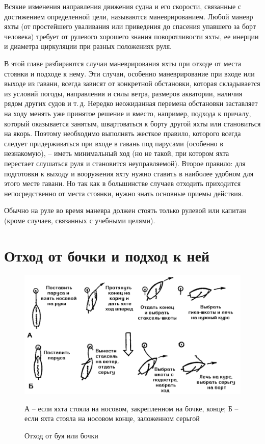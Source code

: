 \documentclass[a4paper, 12pt, twoside, final]{scrbook}
\begin{document}
Всякие изменения направления движения судна и его скорости, связанные с достижением определенной цели, называются маневрированием. Любой маневр яхты (от простейшего уваливания или приведения до спасения упавшего за борт человека) требует от рулевого хорошего знания поворотливости яхты, ее инерции и диаметра циркуляции при разных положениях руля.

В этой главе разбираются случаи маневрирования яхты при отходе от места стоянки и подходе к нему. Эти случаи, особенно маневрирование при входе или выходе из гавани, всегда зависят от конкретной обстановки, которая складывается из условий погоды, направления и силы ветра, размеров акватории, наличия рядом других судов и т.\,д. Нередко неожиданная перемена обстановки заставляет на ходу менять уже принятое решение и вместо, например, подхода к причалу, который оказывается занятым, швартоваться к борту другой яхты или становиться на якорь. Поэтому необходимо выполнять жесткое правило, которого всегда следует придерживаться при входе в гавань под парусами (особенно в незнакомую), \--- иметь минимальный ход (но не такой, при котором яхта перестает слушаться руля и становится неуправляемой). Второе правило: для подготовки к выходу и вооружения яхту нужно ставить в наиболее удобном для этого месте гавани. Но так как в большинстве случаев отходить приходится непосредственно от места стоянки, нужно знать основные приемы действия.

Обычно на руле во время маневра должен стоять только рулевой или капитан (кроме случаев, связанных с учебными целями).

\section{Отход от бочки и подход к ней}

\begin{figure}[htbp]
   \centering
   \includegraphics{pics/122_Othod_ot_bochki} %
   \caption{Отход от буя или бочки}
   \label{fig:122}
   \centering\small
   А \--- если яхта стояла на носовом, закрепленном на бочке, конце; Б \--- если яхта стояла на носовом конце, заложенном серьгой
\end{figure}
\end{document}
